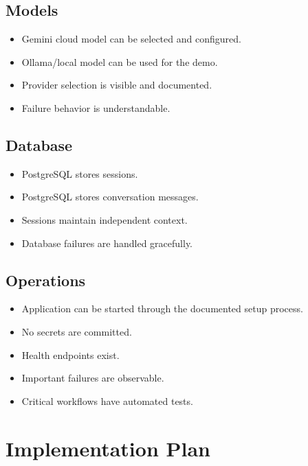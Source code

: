 \documentclass[11pt]{article}
\newcommand{\checkbox}{\textcolor{Muted}{\ding{113}}}
\begin{document}
\subsection{Models}
\begin{itemize}[label=\checkbox]
  \item Gemini cloud model can be selected and configured.
  \item Ollama/local model can be used for the demo.
  \item Provider selection is visible and documented.
  \item Failure behavior is understandable.
\end{itemize}

\subsection{Database}
\begin{itemize}[label=\checkbox]
  \item PostgreSQL stores sessions.
  \item PostgreSQL stores conversation messages.
  \item Sessions maintain independent context.
  \item Database failures are handled gracefully.
\end{itemize}

\subsection{Operations}
\begin{itemize}[label=\checkbox]
  \item Application can be started through the documented setup process.
  \item No secrets are committed.
  \item Health endpoints exist.
  \item Important failures are observable.
  \item Critical workflows have automated tests.
\end{itemize}

\section{Implementation Plan}
\end{document}
